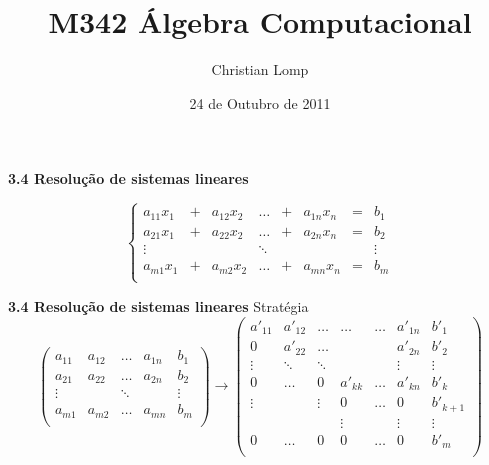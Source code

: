 \documentclass{beamer}
\title[M342]{M342 Álgebra Computacional}
\author{Christian Lomp}
\institute{FCUP}
\date{24 de Outubro de 2011}
\begin{document}
\begin{frame}
\titlepage
\end{frame}







\begin{frame}{\bf 3.4 Resolução de sistemas lineares}


$$\left\{ \begin{array}{cccccccc}
a_{11}x_1 &+& a_{12}x_2 & \ldots &+& a_{1n}x_n &=& b_1 \\
a_{21}x_1 &+& a_{22}x_2 & \ldots &+& a_{2n}x_n &=& b_2 \\
   \vdots &&           & \ddots &&           & &\vdots \\
a_{m1}x_1 &+& a_{m2}x_2 & \ldots &+& a_{mn}x_n &=& b_m \\
\end{array}\right.$$
\end{frame}


\begin{frame}{\bf 3.4 Resolução de sistemas lineares }{Stratégia}
{\small 
$$
\left( \begin{array}{cccc|l}
a_{11} & a_{12} & \ldots & a_{1n} & b_1 \\
a_{21} & a_{22} & \ldots & a_{2n} & b_2 \\
   \vdots &     & \ddots &      &\vdots \\
a_{m1} & a_{m2} & \ldots & a_{mn} & b_m \\
\end{array}\right)\rightarrow
\left( \begin{array}{cccccc|l}
a'_{11}   & a'_{12} & \ldots  & \ldots  & \ldots  & a'_{1n}  & b'_1 \\
0         & a'_{22} & \ldots  &   &   & a'_{2n}  & b'_2 \\
   \vdots & \ddots  & \ddots  &   &   &  \vdots        & \vdots \\
 0        & \ldots  &  0      & a'_{kk} & \ldots  & a'_{kn}  & b'_k \\
\vdots   &         & \vdots  & 0       & \ldots  & 0        & b'_{k+1} \\
         &         &         &  \vdots       &   &   \vdots & \vdots \\
0         & \ldots  & 0      &  0       &  \ldots       & 0         & b'_m \\
\end{array}\right)
$$}
\end{frame}
\end{document}
